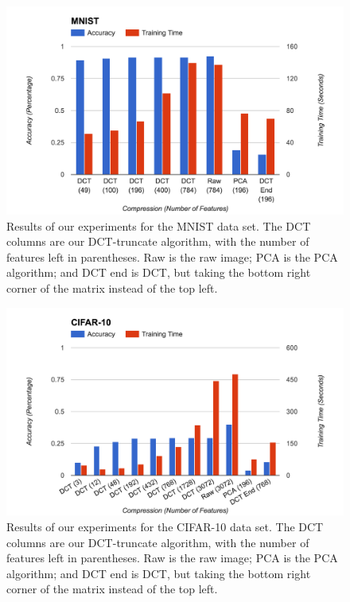 \documentclass[12pt]{article}
\begin{document}
\begin{figure}
    \centering
    \includegraphics[width=\textwidth]{mnist}
    \caption{Results of our experiments for the MNIST data set.  The DCT columns are our DCT-truncate algorithm, with the number of features left in parentheses.  Raw is the raw image; PCA is the PCA algorithm; and DCT end is DCT, but taking the bottom right corner of the matrix instead of the top left.}
    \label{fig:mnist}
\end{figure}

\begin{figure}
    \centering
    \includegraphics[width=\textwidth]{cifar}
    \caption{Results of our experiments for the CIFAR-10 data set.  The DCT columns are our DCT-truncate algorithm, with the number of features left in parentheses.  Raw is the raw image; PCA is the PCA algorithm; and DCT end is DCT, but taking the bottom right corner of the matrix instead of the top left.}
    \label{fig:cifar}
\end{figure} 
\end{document}

